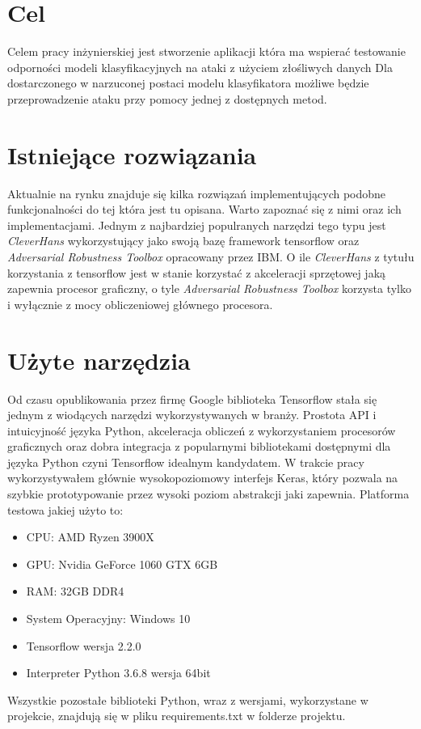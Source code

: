 \documentclass[
    left=2.5cm,         %
    right=2.5cm,        %
    top=2.5cm,          %
    bottom=3cm,         %
    bindingoffset=6mm,  %
    nohyphenation=false %
]{eiti/eiti-thesis}
\begin{document}
\section{Cel}
\label{sec:target}

Celem pracy inżynierskiej jest stworzenie aplikacji która ma wspierać testowanie
odporności modeli klasyfikacyjnych na ataki z użyciem złośliwych danych
Dla dostarczonego w narzuconej postaci modelu klasyfikatora możliwe będzie
przeprowadzenie ataku przy pomocy jednej z dostępnych metod.

\section{Istniejące rozwiązania}

Aktualnie na rynku znajduje się kilka rozwiązań implementujących podobne funkcjonalności
do tej która jest tu opisana. Warto zapoznać się z nimi oraz ich implementacjami.
Jednym z najbardziej populranych narzędzi tego typu jest \textit{CleverHans}\cite{DBLP:journals/corr/GoodfellowPM16}
wykorzystujący jako swoją bazę framework tensorflow oraz \textit{Adversarial Robustness Toolbox}\cite{DBLP:journals/corr/abs-1807-01069} opracowany przez IBM.
O ile \textit{CleverHans} z tytułu korzystania z tensorflow jest w stanie korzystać z akceleracji sprzętowej jaką zapewnia procesor graficzny, o tyle
\textit{Adversarial Robustness Toolbox} korzysta tylko i wyłącznie z mocy obliczeniowej głównego procesora.

\section{Użyte narzędzia}
Od czasu opublikowania przez firmę Google biblioteka Tensorflow \cite{DBLP:journals/corr/AbadiABBCCCDDDG16}
stała się jednym z wiodących narzędzi wykorzystywanych w branży. Prostota API i intuicyjność
języka Python, akceleracja obliczeń z wykorzystaniem procesorów graficznych oraz dobra integracja z
popularnymi bibliotekami dostępnymi dla języka Python czyni Tensorflow idealnym kandydatem.
W trakcie pracy wykorzystywałem głównie wysokopoziomowy interfejs Keras, który pozwala na szybkie
prototypowanie przez wysoki poziom abstrakcji jaki zapewnia.
Platforma testowa jakiej użyto to:
\begin{itemize}
    \item CPU: AMD Ryzen 3900X
    \item GPU: Nvidia GeForce 1060 GTX 6GB
    \item RAM: 32GB DDR4
    \item System Operacyjny: Windows 10
    \item Tensorflow wersja 2.2.0
    \item Interpreter Python 3.6.8 wersja 64bit
\end{itemize}
Wszystkie pozostałe biblioteki Python, wraz z wersjami, wykorzystane w projekcie, znajdują się w pliku
requirements.txt w folderze projektu.
\end{document}
